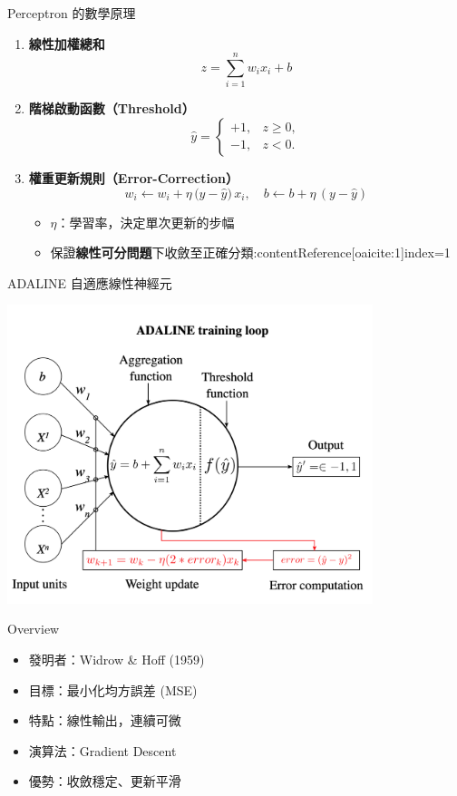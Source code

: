 \documentclass{beamer}
\begin{document}
\begin{frame}{Perceptron 的數學原理}
\begin{enumerate}
  \item \textbf{線性加權總和}
  \[
    z = \sum_{i=1}^{n} w_i x_i + b
  \]
  \item \textbf{階梯啟動函數（Threshold）}
  \[
    \hat{y} =
    \begin{cases}
      +1, & z \ge 0,\\
      -1, & z < 0.
    \end{cases}
  \]
  \item \textbf{權重更新規則（Error-Correction）}
  \[
    w_i \leftarrow w_i + \eta\,\bigl(y - \hat{y}\bigr)\,x_i,
    \quad
    b \leftarrow b + \eta\,(y - \hat{y})
  \]
  \begin{itemize}
    \item $\eta$：學習率，決定單次更新的步幅  
    \item 保證\textbf{線性可分問題}下收斂至正確分類:contentReference[oaicite:1]{index=1}
  \end{itemize}
\end{enumerate}
\end{frame}

\begin{frame}{ADALINE 自適應線性神經元}
    \begin{center}
        \includegraphics[width=0.8\textwidth]{ADALINE_picture.png}
    \end{center}
\end{frame}

\begin{frame}{Overview}
\begin{itemize}
\item 發明者：Widrow \& Hoff (1959)
\item 目標：最小化均方誤差 (MSE)
\item 特點：線性輸出，連續可微
\item 演算法：Gradient Descent
\item 優勢：收斂穩定、更新平滑
\end{itemize}
\end{frame}
\end{document}
